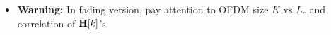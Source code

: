 \documentclass[xcolor=dvipsnames,aspectratio=169]{beamer}
\begin{document}
{\begin{itemize}
\begin{equation}
            \begin{split}
                C&=\sup_{\Sb_{\x_{tot}}}\log\det\left(\I+\frac{1}{\sigma_z}\Hb_{tot}\Sb_{\x_{tot}}\Hb_{tot}^H\right)\\
                 &=\sup_{\{\Sb_{\x[k]}\}_{k=0}^{K-1}}\sum_{k=0}^{K-1}\log\det\left(\I+\frac{1}{\sigma_z}\Hb[k]\Sb_{\x[k]}\Hb^H[k]\right)
            \end{split}
          \end{equation}
      \item \textbf{Warning:} In fading version, pay attention to OFDM size $K$ vs $L_c$ and correlation of $\mathbf{H}[k]$'s
    \end{itemize}
}
\end{document}

